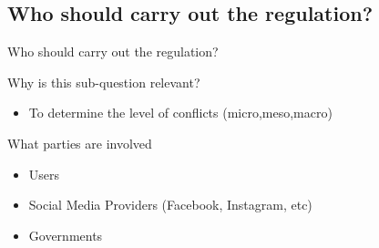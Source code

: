     \subsection{Who should carry out the regulation?}
    \begin{frame}{Who should carry out the regulation?}

        \begin{block}  {Why is this sub-question relevant?}
        \begin{itemize}
            \item To determine the level of conflicts (micro,meso,macro)
        \end{itemize}
        \end{block}
        
        \begin{block} {What parties are involved} 
        \begin{itemize}
            \item Users
            \item Social Media Providers (Facebook, Instagram, etc)
            \item Governments
        \end{itemize}
        \end{block}

    \end{frame}

